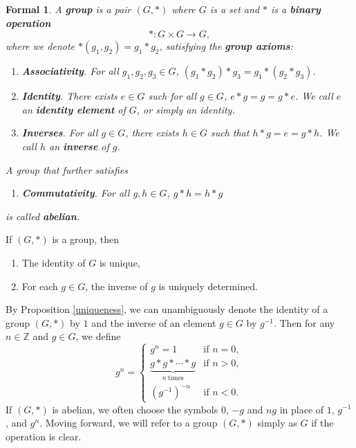 \documentclass{amsart}
\newtheorem*{formal}{Formal}
\begin{document}
\begin{definition}
	\begin{formal}
		A \textbf{group} is a pair \((G, \ast)\) where \(G\) is a set and
		\(\ast\) is a \textbf{binary operation} 
		\[
		   \ast: G\times G\to G,
		\]
		where we denote \(\ast(g_1, g_2) = g_1\ast g_2\), satisfying the
		\textbf{group axioms}:
		\begin{enumerate}[label=(\roman*)]
			\item \textbf{Associativity}. For all \(g_1, g_2, g_3\in G\), \((g_1\ast
			g_2)\ast g_3 = g_1\ast(g_2\ast g_3)\).
			\item \textbf{Identity}. There exists \(e\in G\) such for all \(g\in G\),
			\(e\ast g = g = g\ast e\). We call \(e\) an \textbf{identity element}
			of \(G\), or simply an identity.
			\item \textbf{Inverses}. For all \(g\in G\), there exists \(h\in G\)
			such that
			\(h\ast g = e = g\ast h\). We call \(h\) an \textbf{inverse} of \(g\).
		\end{enumerate}
		A group that further satisfies 
		\begin{enumerate}[label=(\roman*)]
			\item[(iv)] \textbf{Commutativity}. For all \(g, h\in G\), \(g\ast h =
			h\ast g\)
		\end{enumerate} is called \textbf{abelian}.	
	\end{formal}
\end{definition}

\begin{proposition}[{\cite[p.~18]{df}}]\label{uniqueness}
   If \((G, \ast)\) is a group, then 
	\begin{enumerate}[label=(\roman*)]
		\item The identity of \(G\) is unique,
		\item For each \(g\in G\), the inverse of \(g\) is uniquely determined.
   \end{enumerate}
\end{proposition}
By Proposition \ref{uniqueness}, we can unambiguously denote the identity of a
group \((G, \ast)\) by \(1\) and the inverse of
an element \(g\in G\) by \(g^{-1}\). Then for any \(n\in\mathbb{Z}\) and \(g\in
G\), we define 
\[
   g^n = 
	\begin{cases}
		g^n = 1 & \text{if }n = 0,\\
		\underbrace{g\ast g\ast\cdots\ast g}_{n~\text{times}} &\text{if }n >0,\\
		(g^{-1})^{-n} & \text{if }n<0.
   \end{cases}
\]
If \((G, \ast)\) is abelian, we often
choose the symbols \(0\), \(-g\) and \(ng\) in place of \(1\), \(g^{-1}\), and
\(g^n\). Moving forward, we will refer to a group \((G, \ast)\) simply as \(G\)
if the operation is clear.
\end{document}
